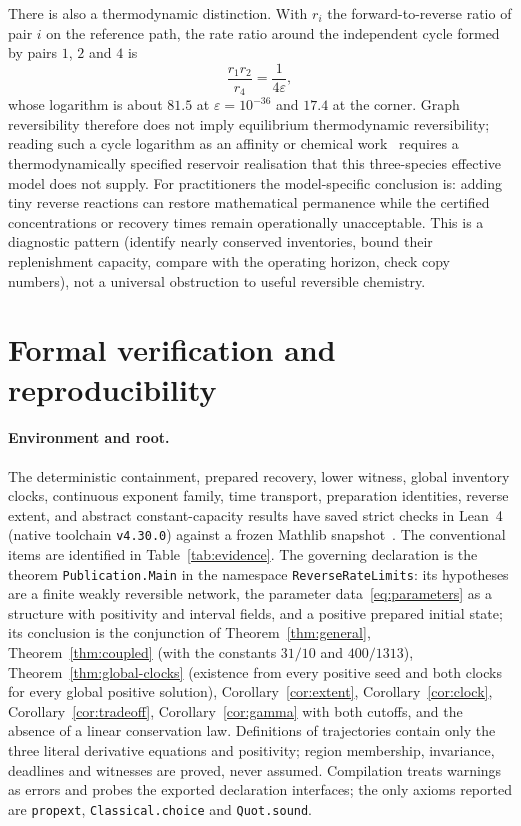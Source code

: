 \documentclass[11pt,a4paper]{article}
\theoremstyle{plain}
\theoremstyle{definition}
\theoremstyle{remark}
\newcommand{\eps}{\varepsilon}
\newcommand{\lean}[1]{\texttt{#1}}
\begin{document}
There is also a thermodynamic distinction. With $r_i$ the forward-to-reverse ratio of pair $i$ on the reference path, the rate ratio around the independent cycle formed by pairs $1$, $2$ and $4$ is
\begin{equation}\label{eq:cycle-ratio}
 \frac{r_1r_2}{r_4}=\frac1{4\eps},
\end{equation}
whose logarithm is about $81.5$ at $\eps=10^{-36}$ and $17.4$ at the corner. Graph reversibility therefore does not imply equilibrium thermodynamic reversibility; reading such a cycle logarithm as an affinity or chemical work~\cite{Schnakenberg1976} requires a thermodynamically specified reservoir realisation that this three-species effective model does not supply. For practitioners the model-specific conclusion is: adding tiny reverse reactions can restore mathematical permanence while the certified concentrations or recovery times remain operationally unacceptable. This is a diagnostic pattern (identify nearly conserved inventories, bound their replenishment capacity, compare with the operating horizon, check copy numbers), not a universal obstruction to useful reversible chemistry.

\section{Formal verification and reproducibility}
\label{sec:formal}

\paragraph{Environment and root.}
The deterministic containment, prepared recovery, lower witness, global inventory clocks, continuous exponent family, time transport, preparation identities, reverse extent, and abstract constant-capacity results have saved strict checks in Lean~4 (native toolchain \lean{v4.30.0}) against a frozen Mathlib snapshot~\cite{Lean4,Mathlib2020}. The conventional items are identified in Table~\ref{tab:evidence}. The governing declaration is the theorem \lean{Publication.Main} in the namespace \lean{ReverseRateLimits}: its hypotheses are a finite weakly reversible network, the parameter data~\eqref{eq:parameters} as a structure with positivity and interval fields, and a positive prepared initial state; its conclusion is the conjunction of Theorem~\ref{thm:general}, Theorem~\ref{thm:coupled} (with the constants $31/10$ and $400/1313$), Theorem~\ref{thm:global-clocks} (existence from every positive seed and both clocks for every global positive solution), Corollary~\ref{cor:extent}, Corollary~\ref{cor:clock}, Corollary~\ref{cor:tradeoff}, Corollary~\ref{cor:gamma} with both cutoffs, and the absence of a linear conservation law. Definitions of trajectories contain only the three literal derivative equations and positivity; region membership, invariance, deadlines and witnesses are proved, never assumed. Compilation treats warnings as errors and probes the exported declaration interfaces; the only axioms reported are \lean{propext}, \lean{Classical.choice} and \lean{Quot.sound}.
\end{document}
